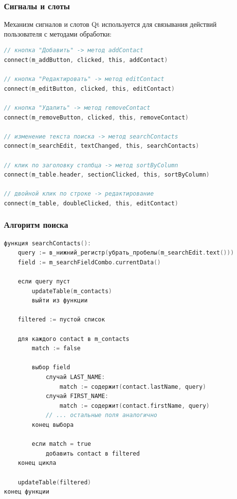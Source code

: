 \subsubsection*{Сигналы и слоты}

Механизм сигналов и слотов Qt используется для связывания действий пользователя с методами обработки:

\begin{lstlisting}[language=C, caption=Подключение сигналов и слотов]
// кнопка "Добавить" -> метод addContact
connect(m_addButton, clicked, this, addContact)

// кнопка "Редактировать" -> метод editContact
connect(m_editButton, clicked, this, editContact)

// кнопка "Удалить" -> метод removeContact
connect(m_removeButton, clicked, this, removeContact)

// изменение текста поиска -> метод searchContacts
connect(m_searchEdit, textChanged, this, searchContacts)

// клик по заголовку столбца -> метод sortByColumn
connect(m_table.header, sectionClicked, this, sortByColumn)

// двойной клик по строке -> редактирование
connect(m_table, doubleClicked, this, editContact)
\end{lstlisting}

\subsubsection*{Алгоритм поиска}

\begin{lstlisting}[language=C, caption=Функция searchContacts]
функция searchContacts():
    query := в_нижний_регистр(убрать_пробелы(m_searchEdit.text()))
    field := m_searchFieldCombo.currentData()
    
    если query пуст
        updateTable(m_contacts)
        выйти из функции
    
    filtered := пустой список
    
    для каждого contact в m_contacts
        match := false
        
        выбор field
            случай LAST_NAME:
                match := содержит(contact.lastName, query)
            случай FIRST_NAME:
                match := содержит(contact.firstName, query)
            // ... остальные поля аналогично
        конец выбора
        
        если match = true
            добавить contact в filtered
    конец цикла
    
    updateTable(filtered)
конец функции
\end{lstlisting}

